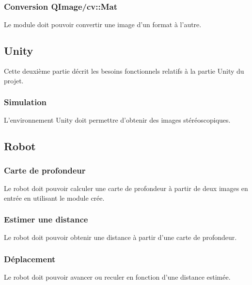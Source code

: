 \documentclass[a4paper]{article}
\begin{document}
\subsubsection*{Conversion QImage/cv::Mat}

Le module doit pouvoir convertir une image d'un format à l'autre.

\subsection*{Unity}

Cette deuxième partie décrit les besoins fonctionnels relatifs à la partie Unity
du projet.

\subsubsection*{Simulation}

L'environnement Unity doit permettre d'obtenir des images stéréoscopiques.

\subsection*{Robot}

\subsubsection*{Carte de profondeur}

Le robot doit pouvoir calculer une carte de profondeur à partir de deux images en
entrée en utilisant le module crée.

\subsubsection*{Estimer une distance}

Le robot doit pouvoir obtenir une distance à partir d'une carte de profondeur.

\subsubsection*{Déplacement}

Le robot doit pouvoir avancer ou reculer en fonction d'une distance estimée.

\end{document}
